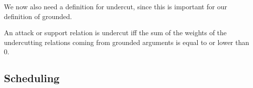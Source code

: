 We now also need a definition for undercut, since this is important for our
definition of grounded.
\begin{defn}
    An attack or support relation is undercut iff the sum of the weights of the
    undercutting relations coming from grounded arguments is equal to or
    lower than 0.
\end{defn}


\subsection{Scheduling}


